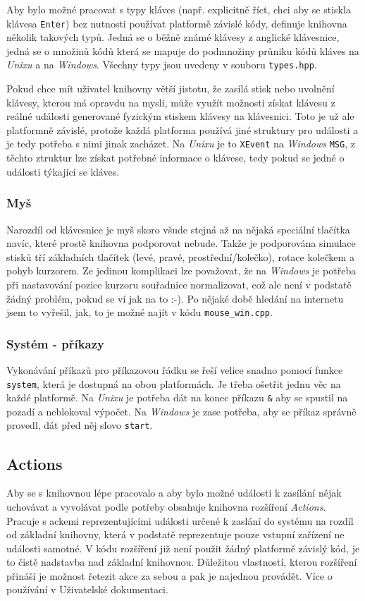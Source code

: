 \documentclass[12pt]{article}
\newcommand{\code}[1]{\texttt{#1}}
\begin{document}
    Aby bylo možné pracovat s typy kláves (např. explicitně říct, chci aby se stiskla klávesa \code{Enter}) bez nutnosti používat platformě závislé kódy, definuje knihovna několik takových typů. Jedná se o běžně známé klávesy z anglické klávesnice, jedná se o množinů kódů která se mapuje do podmnožiny průniku kódů kláves na \emph{Unixu} a na \emph{Windows}. Všechny typy jsou uvedeny v souboru \code{types.hpp}.
    
    Pokud chce mít uživatel knihovny větší jistotu, že zasílá stisk nebo uvolnění klávesy, kterou má opravdu na mysli, může využít možnosti získat klávesu z reálné události generované fyzickým stiskem klávesy na klávesnici. Toto je už ale platformně závislé, protože každá platforma používá jiné struktury pro události a je tedy potřeba s nimi jinak zacházet. Na \emph{Unixu} je to \code{XEvent} na \emph{Windows} \code{MSG}, z těchto ztruktur lze získat potřebné informace o klávese, tedy pokud se jedné o události týkající se kláves.

    \subsubsection{Myš}
    Narozdíl od klávesnice je myš skoro všude stejná až na nějaká speciální tlačítka navíc, které prostě knihovna podporovat nebude. Takže je podporována simulace stisků tří základních tlačítek (levé, pravé, prostřední/kolečko), rotace kolečkem a pohyb kurzorem. Ze jedinou komplikaci lze považovat, že na \emph{Windows} je potřeba při nastavování pozice kurzoru souřadnice normalizovat, což ale není v podstatě žádný problém, pokud se ví jak na to :-). Po nějaké době hledání na internetu jsem to vyřešil, jak, to je možné najít v kódu \code{mouse\_win.cpp}.

    \subsubsection{Systém - příkazy}
    Vykonávání příkazů pro příkazovou řádku se řeší velice snadno pomocí funkce \code{system}, která je dostupná na obou platformách. Je třeba ošetřit jednu věc na každé platformě. Na \emph{Unixu} je potřeba dát na konec příkazu \code{\&} aby se spustil na pozadí a neblokoval výpočet. Na \emph{Windows} je zase potřeba, aby se příkaz správně provedl, dát před něj slovo \code{start}.

    \subsection{Actions}
    Aby se s knihovnou lépe pracovalo a aby bylo možné události k zasílání nějak uchovávat a vyvolávat podle potřeby obsahuje knihovna rozšíření \emph{Actions}. Pracuje s ackemi reprezentujícími události určené k zaslání do systému na rozdíl od základní knihovny, která v podstatě reprezentuje pouze vstupní zařízení ne události samotné. V kódu rozšíření již není použit žádný platformě závislý kód, je to čistě nadstavba nad základní knihovnou. Důležitou vlastností, kterou rozšíření přináší je možnost řetezit akce za sebou a pak je najednou provádět. Více o používání v Uživatelské dokumentaci.
\end{document}
